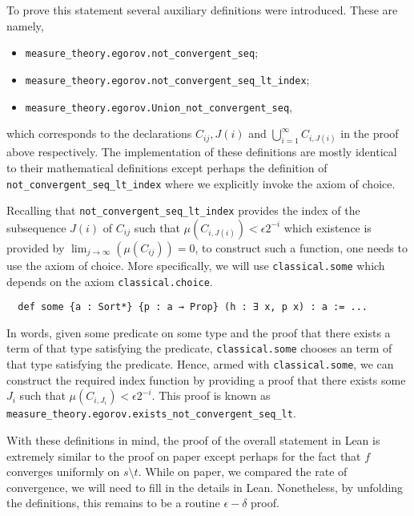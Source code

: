 \documentclass[]{article}
\theoremstyle{definition}
\begin{document}
To prove this statement several auxiliary definitions were introduced. These are 
namely,
\begin{itemize}
  \item \texttt{measure_theory.egorov.not_convergent_seq};
  \item \texttt{measure_theory.egorov.not_convergent_seq_lt_index};
  \item \texttt{measure_theory.egorov.Union_not_convergent_seq},
\end{itemize}
which corresponds to the declarations \(C_{ij}, J(i)\) and \(\bigcup_{i = 1}^\infty C_{i, J(i)}\) 
in the proof above respectively. The implementation of these definitions are mostly
identical to their mathematical definitions except perhaps the definition of 
\texttt{not_convergent_seq_lt_index} where we explicitly invoke 
the axiom of choice. 

Recalling that \texttt{not_convergent_seq_lt_index} provides the index 
of the subsequence \(J(i)\) of \(C_{ij}\) such that \(\mu(C_{i,J(i)}) < \epsilon 2^{-i}\)
which existence is provided by \(\lim_{j \to \infty}(\mu(C_{ij})) = 0\), to construct 
such a function, one needs to use the axiom of choice. More specifically, 
we will use \texttt{classical.some} which depends on the axiom 
\texttt{classical.choice}.
\begin{verbatim}
  def some {a : Sort*} {p : a → Prop} (h : ∃ x, p x) : a := ...
\end{verbatim}
In words, given some predicate on some type and the proof that there exists a term 
of that type satisfying the predicate, \texttt{classical.some} chooses an 
term of that type satisfying the predicate. Hence, armed with \texttt{classical.some},
we can construct the required index function by providing a proof 
that there exists some \(J_i\) such that \(\mu(C_{i, J_i}) < \epsilon 2^{-i}\).
This proof is known as \texttt{measure_theory.egorov.exists_not_convergent_seq_lt}.

With these definitions in mind, the proof of the overall statement in Lean is 
extremely similar to the proof on paper except perhaps for the fact that \(f\)
converges uniformly on \(s \setminus t\). While on paper, we compared the rate 
of convergence, we will need to fill in the details in Lean. Nonetheless, by 
unfolding the definitions, this remains to be a routine \(\epsilon-\delta\) proof.
\end{document}
